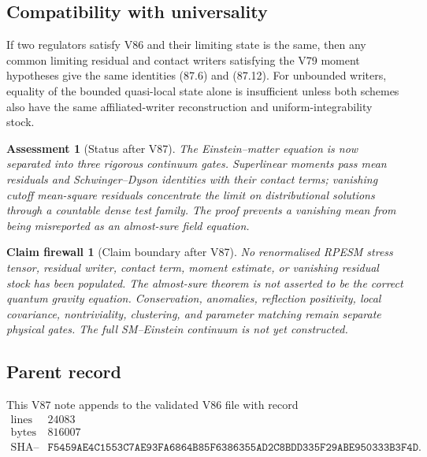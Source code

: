 \documentclass[11pt]{article}
\newtheorem{firewall}[theorem]{Claim firewall}
\newtheorem{assessment}[theorem]{Assessment}
\theoremstyle{remark}
\begin{document}
\subsection{Compatibility with universality}

If two regulators satisfy V86 and their limiting state is the same,
then any common limiting residual and contact writers satisfying the
V79 moment hypotheses give the same identities (87.6) and (87.12).
For unbounded writers, equality of the bounded quasi-local state
alone is insufficient unless both schemes also have the same
affiliated-writer reconstruction and uniform-integrability stock.

\begin{assessment}[Status after V87]
\label{ass:v12v87-status}
The Einstein--matter equation is now separated into three rigorous
continuum gates.  Superlinear moments pass mean residuals and
Schwinger--Dyson identities with their contact terms; vanishing
cutoff mean-square residuals concentrate the limit on
distributional solutions through a countable dense test family.
The proof prevents a vanishing mean from being misreported as an
almost-sure field equation.
\end{assessment}

\begin{firewall}[Claim boundary after V87]
\label{fire:v12v87-claim}
No renormalised RPESM stress tensor, residual writer, contact term,
moment estimate, or vanishing residual stock has been populated.
The almost-sure theorem is not asserted to be the correct quantum
gravity equation.  Conservation, anomalies, reflection positivity,
local covariance, nontriviality, clustering, and parameter matching
remain separate physical gates.  The full SM--Einstein continuum is
not yet constructed.
\end{firewall}

\subsection{Parent record}

This V87 note appends to the validated V86 file with record
\[
\begin{array}{c|c}
\text{lines}&24083\\
\text{bytes}&816007\\
\text{SHA--256}&
\texttt{F5459AE4C1553C7AE93FA6864B85F6386355AD2C8BDD335F29ABE950333B3F4D}.
\end{array}
\]

\end{document}
